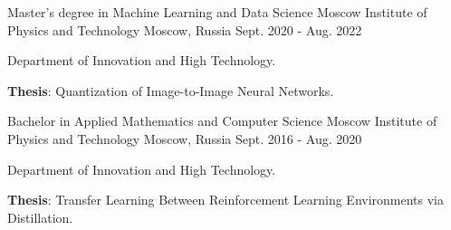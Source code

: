 

\begin{cventries}

  \cventry
  {Master's degree in Machine Learning and Data Science} %
  {Moscow Institute of Physics and Technology} %
  {Moscow, Russia} %
  {Sept. 2020 - Aug. 2022} %
  {
    \begin{cvitems} %
      \item {Department of Innovation and High Technology.}
      \item {\textbf{Thesis}: Quantization of Image-to-Image Neural Networks.}
    \end{cvitems}
  }

  \cventry
  {Bachelor in Applied Mathematics and Computer Science} %
  {Moscow Institute of Physics and Technology} %
  {Moscow, Russia} %
  {Sept. 2016 - Aug. 2020} %
  {
    \begin{cvitems} %
      \item {Department of Innovation and High Technology.}
      \item {\textbf{Thesis}: Transfer Learning Between Reinforcement Learning Environments via Distillation.}
    \end{cvitems}
  }

\end{cventries}
